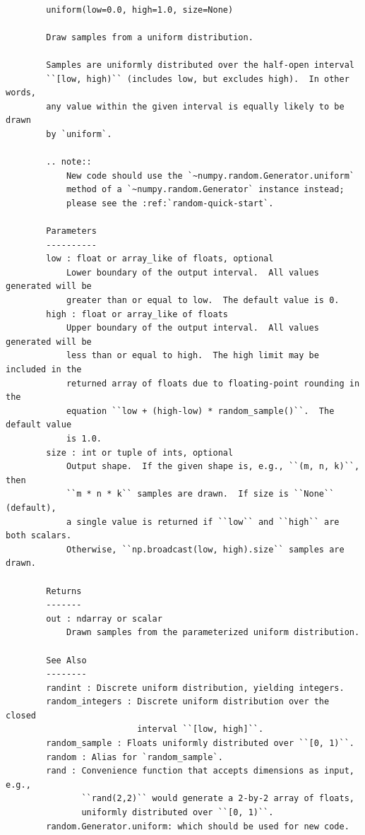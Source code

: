 \documentclass[
  brazilian,
  letterpaper,
  DIV=11,
  numbers=noendperiod]{scrreprt}
\begin{document}
\begin{verbatim}

        uniform(low=0.0, high=1.0, size=None)

        Draw samples from a uniform distribution.

        Samples are uniformly distributed over the half-open interval
        ``[low, high)`` (includes low, but excludes high).  In other words,
        any value within the given interval is equally likely to be drawn
        by `uniform`.

        .. note::
            New code should use the `~numpy.random.Generator.uniform`
            method of a `~numpy.random.Generator` instance instead;
            please see the :ref:`random-quick-start`.

        Parameters
        ----------
        low : float or array_like of floats, optional
            Lower boundary of the output interval.  All values generated will be
            greater than or equal to low.  The default value is 0.
        high : float or array_like of floats
            Upper boundary of the output interval.  All values generated will be
            less than or equal to high.  The high limit may be included in the 
            returned array of floats due to floating-point rounding in the 
            equation ``low + (high-low) * random_sample()``.  The default value 
            is 1.0.
        size : int or tuple of ints, optional
            Output shape.  If the given shape is, e.g., ``(m, n, k)``, then
            ``m * n * k`` samples are drawn.  If size is ``None`` (default),
            a single value is returned if ``low`` and ``high`` are both scalars.
            Otherwise, ``np.broadcast(low, high).size`` samples are drawn.

        Returns
        -------
        out : ndarray or scalar
            Drawn samples from the parameterized uniform distribution.

        See Also
        --------
        randint : Discrete uniform distribution, yielding integers.
        random_integers : Discrete uniform distribution over the closed
                          interval ``[low, high]``.
        random_sample : Floats uniformly distributed over ``[0, 1)``.
        random : Alias for `random_sample`.
        rand : Convenience function that accepts dimensions as input, e.g.,
               ``rand(2,2)`` would generate a 2-by-2 array of floats,
               uniformly distributed over ``[0, 1)``.
        random.Generator.uniform: which should be used for new code.


\end{verbatim}
\end{document}
